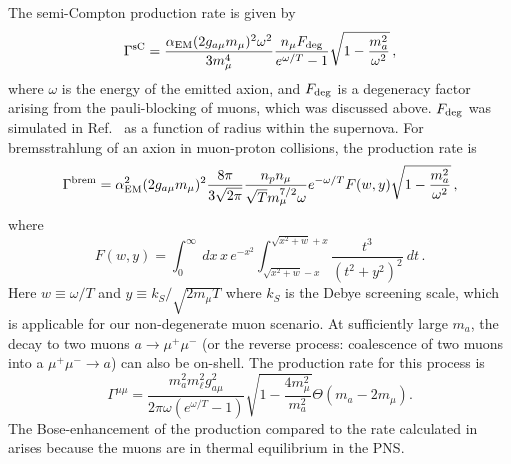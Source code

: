 \documentclass[11pt]{article}
\newcommand{\beq}{\begin{equation}} \newcommand{\eeq}{\end{equation}}
\begin{document}
The semi-Compton production rate is given by~\cite{Redondo:2013wwa} 
\begin{equation}
    \Gamma^{\text{sC}} = \frac{\alpha_{\rm EM} (2 g_{a\mu}m_{\mu})^2 \omega^2}{3 m_{\mu}^4} \frac{n_{\mu} F_{\text{deg}}}{e^{\omega/T} - 1} \sqrt{1- \frac{m_a^2}{\omega^2}} \, ,
\end{equation}
where $\omega$ is the energy of the emitted axion, and $F_{\rm deg}$ is a degeneracy factor arising from the pauli-blocking of muons, which was discussed above. $F_{\rm deg}$ was simulated in Ref.~\cite{Bollig:2020xdr} as a function of radius within the supernova. For bremsstrahlung of an axion in muon-proton collisions, the production rate is~\cite{Redondo:2013wwa} 
\begin{equation}
    \Gamma^{\text{brem}} = \alpha_{\rm EM}^2 (2 g_{a\mu}m_{\mu})^2 \frac{8\pi}{3\sqrt{2\pi}}\frac{n_p n_{\mu}}{\sqrt{T} m_{\mu}^{7/2} \omega} e^{-\omega/T} F(w, y) \sqrt{1- \frac{m_a^2}{\omega^2}} \,,
\end{equation}
where
\begin{equation}
    F(w, y) = \int_0^{\infty}~dx \, x \, e^{-x^2} \int_{\sqrt{x^2 + w} -x}^{\sqrt{x^2 + w}+x} \frac{t^3}{(t^2 + y^2)^2}~dt\,.
\end{equation}
Here $w \equiv \omega/T$ and $y \equiv k_S/\sqrt{2 m_{\mu} T}$ where $k_S$ is the Debye screening scale, which is applicable for our non-degenerate muon scenario.
At sufficiently large $m_a$, the decay to two muons $a \to \mu^+ \mu^-$ (or the reverse process: coalescence of two muons into a $\mu^+ \mu^- \to a$)  can also be on-shell. The production rate for this process is
\beq
\Gamma^{\mu \mu} = \frac{m_a^2 m_\ell^2 g_{a\mu}^2}{2\pi \omega  (e^{\omega/T} - 1 )} \sqrt{1- \frac{4 m_\mu^2}{m_a^2}} \Theta(m_a - 2m_\mu) .
\eeq
The Bose-enhancement of the production compared to the rate calculated in~\cite{Bauer:2017ris} arises because the muons are in thermal equilibrium in the PNS.
\end{document}
